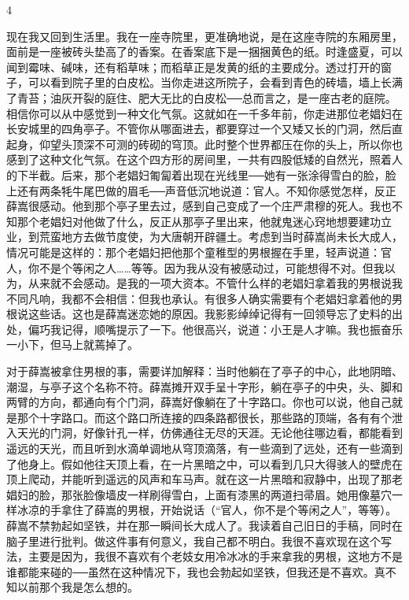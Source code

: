 4 

现在我又回到生活里。我在一座寺院里，更准确地说，是在这座寺院的东厢房里，面前是一座被砖头垫高了的香案。在香案底下是一捆捆黄色的纸。时逢盛夏，可以闻到霉味、碱味，还有稻草味；而稻草正是发黄的纸的主要成分。透过打开的窗子，可以看到院子里的白皮松。当你走进这所院子，会看到青色的砖墙，墙上长满了青苔；油灰开裂的庭住、肥大无比的白皮松──总而言之，是一座古老的庭院。相信你可以从中感觉到一种文化气氛。这就如在一千多年前，你走进那位老娼妇在长安城里的四角亭子。不管你从哪面进去，都要穿过一个又矮又长的门洞，然后直起身，仰望头顶深不可测的砖砌的穹顶。此时整个世界都压在你的头上，所以你也感到了这种文化气氛。在这个四方形的房间里，一共有四股低矮的自然光，照着人的下半截。后来，那个老娼妇匍匐着出现在光线里──她有一张涂得雪白的脸，脸上还有两条牦牛尾巴做的眉毛──声音低沉地说道：官人。不知你感觉怎样，反正薛嵩很感动。他到那个亭子里去过，感到自己变成了一个庄严肃穆的死人。我也不知那个老娼妇对他做了什么，反正从那亭子里出来，他就鬼迷心窍地想要建功立业，到荒蛮地方去做节度使，为大唐朝开辟疆土。考虑到当时薛嵩尚未长大成人，情况可能是这样的：那个老娼妇把他那个童稚型的男根握在手里，轻声说道：官人，你不是个等闲之人……等等。因为我从没有被感动过，可能想得不对。但我以为，从来就不会感动。是我的一项大资本。不管什么样的老娼妇拿着我的男根说我不同凡响，我都不会相信：但我也承认。有很多人确实需要有个老娼妇拿着他的男根说这些话。这也是薛嵩迷恋她的原因。我影影绰绰记得有一回领导忘了史料的出处，偏巧我记得，顺嘴提示了一下。他很高兴，说道：小王是人才嘛。我也振奋乐一小下，但马上就蔫掉了。 

对于薛嵩被拿住男根的事，需要详加解释：当时他躺在了亭子的中心，此地阴暗、潮湿，与亭子这个名称不符。薛嵩摊开双手呈十字形，躺在亭子的中央，头、脚和两臂的方向，都通向有个门洞，薛嵩好像躺在了十字路口。你也可以说，他自己就是那个十字路口。而这个路口所连接的四条路都很长，那些路的顶端，各有有个泄入天光的门洞，好像针孔一样，仿佛通往无尽的天涯。无论他往哪边看，都能看到遥远的天光，而且听到水滴单调地从穹顶滴落，有一些滴到了远处，还有一些滴到了他身上。假如他往天顶上看，在一片黑暗之中，可以看到几只大得骇人的壁虎在顶上爬动，并能听到遥远的风声和车马声。就在这一片黑暗和寂静中，出现了那老娼妇的脸，那张脸像墙皮一样刷得雪白，上面有漆黑的两道扫帚眉。她用像墓穴一样冰凉的手拿住了薛嵩的男根，开始说话（“官人，你不是个等闲之人”，等等）。薛嵩不禁勃起如坚铁，并在那一瞬间长大成人了。我读着自己旧日的手稿，同时在脑子里进行批判。做这件事有何意义，我自己都不明白。我很不喜欢现在这个写法，主要是因为，我很不喜欢有个老妓女用冷冰冰的手来拿我的男根，这地方不是谁都能来碰的──虽然在这种情况下，我也会勃起如坚铁，但我还是不喜欢。真不知以前那个我是怎么想的。

